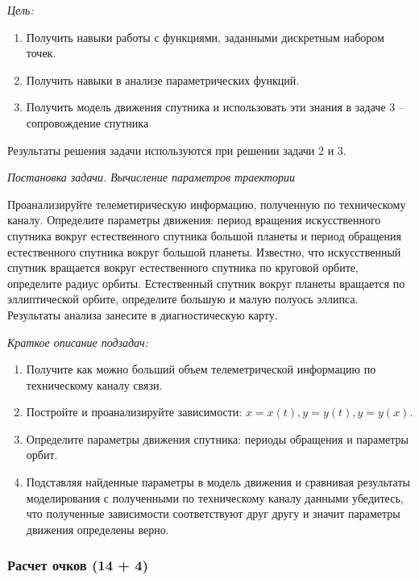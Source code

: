 
\textit{Цель:}

\begin{enumerate}
    \item Получить навыки работы с функциями, заданными дискретным набором точек.
    \item Получить навыки в анализе параметрических функций.
    \item Получить модель движения спутника и использовать эти знания в задаче 3 – сопровождение спутника
\end{enumerate}

Результаты решения задачи используются при решении задачи 2 и 3.

\textit{Постановка задачи. Вычисление параметров траектории}

Проанализируйте телеметирическую информацию, полученную по техническому каналу. Определите параметры движения: период вращения искусственного спутника вокруг естественного спутника большой планеты и период обращения естественного спутника вокруг большой планеты. Известно, что искусственный спутник вращается вокруг естественного спутника по круговой орбите, определите радиус орбиты. Естественный спутник вокруг планеты вращается по эллиптической орбите, определите большую и малую полуось эллипса. Результаты анализа занесите в диагностическую карту.

\textit{Краткое описание подзадач:}

\begin{enumerate}
    \item Получите как можно больший объем телеметрической информацию по техническому каналу связи.
    \item Постройте и проанализируйте зависимости: $x = x(t), y = y(t), y = y(x)$.
    \item Определите параметры движения спутника: периоды обращения и параметры орбит.
    \item Подставляя найденные параметры в модель движения и сравнивая результаты моделирования с полученными по техническому каналу данными убедитесь, что полученные зависимости соответствуют друг другу и значит параметры движения определены верно.
\end{enumerate}

\subsubsection*{Расчет очков (14 + 4)}

